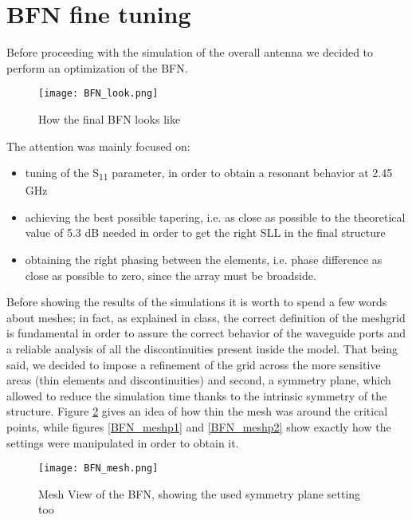 \newpage
\section{BFN fine tuning}

Before proceeding with the simulation of the overall antenna we decided to perform an optimization of the BFN.

\begin{figure}[H]
\centering
\texttt{[image: BFN\_look.png]}
\caption{How the final BFN looks like}
\label{BFN_look}
\end{figure}

\par\medskip
\noindent
The attention was mainly focused on:

\begin{itemize}
\item tuning of the S\textsubscript{11} parameter, in order to obtain a resonant behavior at 2.45 GHz
\item achieving the best possible tapering, i.e. as close as possible to the theoretical value of 5.3 dB needed in order to get the right SLL in the final structure
\item obtaining the right phasing between the elements, i.e. phase difference as close as possible to zero, since the array must be broadside.
\end{itemize}

\par\medskip
\noindent
Before showing the results of the simulations it is worth to spend a few words about meshes; in fact, as explained in class, the correct definition of the meshgrid is fundamental in order to assure the correct behavior of the waveguide ports and a reliable analysis of all the discontinuities present inside the model. That being said, we decided to impose a refinement of the grid across the more sensitive areas (thin elements and discontinuities) and second, a symmetry plane, which allowed to reduce the simulation time thanks to the intrinsic symmetry of the structure.
\noindent
Figure \ref{BFN_mesh} gives an idea of how thin the mesh was around the critical points, while figures \ref{BFN_meshp1} and \ref{BFN_meshp2} show exactly how the settings were manipulated in order to obtain it.

\begin{figure}[H]
\centering
\texttt{[image: BFN\_mesh.png]}
\caption{Mesh View of the BFN, showing the used symmetry plane setting too}
\label{BFN_mesh}
\end{figure}

